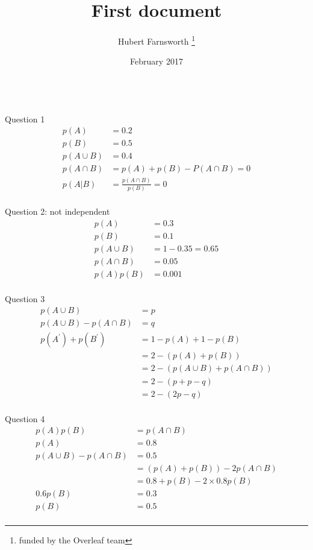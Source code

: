 \documentclass{article}
\title{First document}A
\author{Hubert Farnsworth \thanks{funded by the Overleaf team}}
\date{February 2017}
\begin{document}
\maketitle


	\nonumber \\
	Question 1
	\begin{align}
		p(A) & = 0.2 \nonumber \\
		p(B) & = 0.5 \nonumber \\
		p(A \cup B) & = 0.4  \nonumber \\
		p(A \cap B) & = p(A) + p(B) - P(A \cap B) = 0  \nonumber \\
		p(A \vert B) & = \frac{p(A \cap B)}{ p(B)}=0  \nonumber \\
	\end{align} 
	

	Question 2: not independent
	\begin{align}
		p(A) & = 0.3 \nonumber \\
		p(B) & = 0.1 \nonumber \\
		p(A \cup B) & = 1-0.35=0.65  \nonumber \\
		p(A \cap B) & = 0.05 \nonumber\\ 
		p(A)p(B) & =0.001 \nonumber\\ 
	\end{align}

	Question 3
	\begin{align}
		p(A \cup B) & = p  \nonumber \\
		p(A \cup B) - p(A \cap B) & = q \nonumber\\ 
		p(A^ \prime) + p(B^\prime) & =1 - p(A) + 1 - p(B)  \nonumber\\ 
		& = 2 - (p(A)+p(B)) \nonumber\\
		& = 2 - (p(A \cup B) +  p(A \cap B)) \nonumber\\
		& = 2 - (p + p -q) \nonumber\\
		& = 2 - (2p - q) \nonumber\\
	\end{align}

	Question 4
	\begin{align}
		p(A)p(B) & = p(A \cap B)\nonumber \\
		p(A) & = 0.8 \nonumber \\
		p(A \cup B) - p(A \cap B) & = 0.5 \nonumber\\ 
		& = (p(A)+p(B)) - 2p(A \cap B)\nonumber\\
		& = 0.8 + p(B) - 2\times 0.8p(B) \nonumber\\
		0.6p(B) & = 0.3 \nonumber \\
		p(B) & = 0.5 \nonumber \\
	\end{align}
\end{document}
